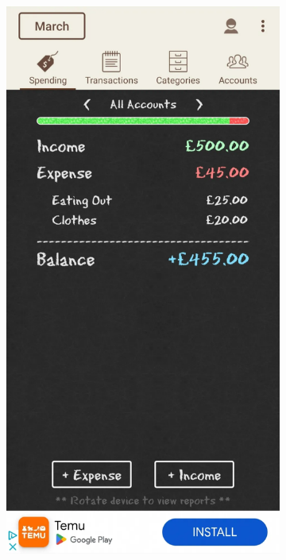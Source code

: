 \documentclass{l4proj}
\begin{document}
\begin{appendices}
\begin{figure}[h]
    \centering
    \begin{subfigure}[t]{0.25\textwidth}
        \vspace{0pt}
        \includegraphics[width=\textwidth]{images/App-Comparison/spending-tracker-ss-1.png}

\end{subfigure}
\end{figure}
\end{appendices}
\end{document}
